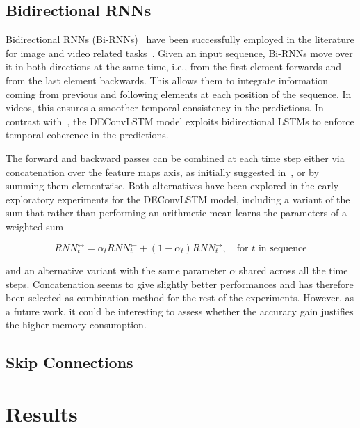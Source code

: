 \subsection{Bidirectional RNNs}
Bidirectional RNNs (Bi-RNNs)~\cite{Schuster1997bidirecrnn} have been
successfully employed in the literature for image and video related
tasks~\cite{visin2015renet,Visin_2016_CVPR_Workshops,Du2015_CVPR}. Given an
input sequence, Bi-RNNs move over it in both directions at the same time, i.e.,
from the first element forwards and from the last element backwards. This
allows them to integrate information coming from previous and following
elements at each position of the sequence. In videos, this ensures a smoother
temporal consistency in the predictions. In contrast with~\cite{ShiCWYWW15},
the DEConvLSTM model exploits bidirectional LSTMs to enforce temporal coherence
in the predictions.

The forward and backward passes can be combined at each time step either via
concatenation over the feature maps axis, as initially suggested in~\cite{
Schuster1997bidirecrnn}, or by summing them elementwise. Both alternatives have
been explored in the early exploratory experiments for the DEConvLSTM model,
including a variant of the sum that rather than performing an arithmetic mean
learns the parameters of a weighted sum

\begin{equation}
    RNN_t^{\leftrightarrow} = \alpha_t RNN_t^{\leftarrow} +
        (1 - \alpha_t) RNN_t^{\rightarrow}, \quad\text{for $t$ in sequence}
\end{equation}

\noindent and an alternative variant with the same parameter $\alpha$ shared
across all the time steps. Concatenation seems to give slightly better
performances and has therefore been selected as combination method for the
rest of the experiments. However, as a future work, it could be interesting to
assess whether the accuracy gain justifies the higher memory consumption.


\subsection{Skip Connections}


\section{Results}\label{sec:deconvLSTM_results}

